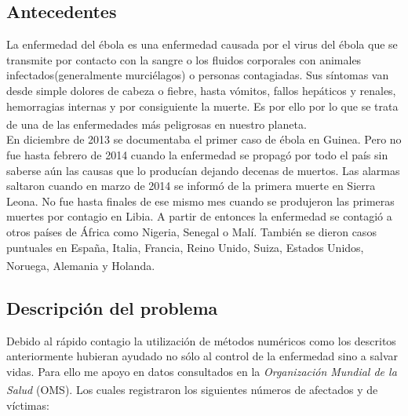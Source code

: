 \documentclass[a4paper,11pt]{article}
\numberwithin{equation}{section}
\begin{document}
\subsection{Antecedentes}
\indent La enfermedad del ébola es una enfermedad causada por el virus del ébola que se transmite por contacto con la sangre o los fluidos corporales con animales infectados(generalmente murciélagos) o personas contagiadas. Sus síntomas van desde simple dolores de cabeza o fiebre, hasta vómitos, fallos hepáticos y renales, hemorragias internas y por consiguiente la muerte. Es por ello por lo que se trata de una de las enfermedades más peligrosas en nuestro planeta.{\tiny \bf \textsuperscript{\cite{wikitres}}} \\

\indent En diciembre de 2013 se documentaba el primer caso de ébola en Guinea. Pero no fue hasta febrero de 2014 cuando la enfermedad se propagó por todo el país sin saberse aún las causas que lo producían dejando decenas de muertos. Las alarmas saltaron cuando en marzo de 2014 se informó de la primera muerte en Sierra Leona. No fue hasta finales de ese mismo mes cuando se produjeron las primeras muertes por contagio en Libia. A partir de entonces la enfermedad se contagió a otros países de África como Nigeria, Senegal o Malí. También se dieron casos puntuales en España, Italia, Francia, Reino Unido, Suiza, Estados Unidos, Noruega, Alemania y Holanda.{\tiny \bf \textsuperscript{\cite{wikicuatro}}}

\subsection{Descripción del problema}
\indent Debido al rápido contagio la utilización de métodos numéricos como los descritos anteriormente hubieran ayudado no sólo al control de la enfermedad sino a salvar vidas. Para ello me apoyo en datos consultados en la \textit{Organización Mundial de la Salud} (OMS){\tiny \bf \textsuperscript{\cite{wikicinco}}}{\tiny \bf \textsuperscript{\cite{oms}}}. Los cuales registraron los siguientes números de afectados y de víctimas:
\end{document}
